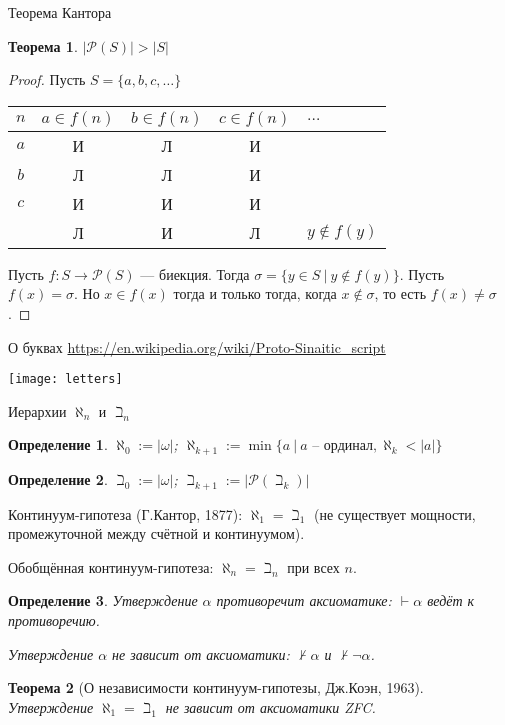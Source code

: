 \documentclass[aspectratio=169]{beamer}
\newtheorem{thm}{Теорема}[section]
\newtheorem{dfn}{Определение}[section]
\begin{document}
\begin{frame}{Теорема Кантора}
\begin{thm}$|\mathcal{P}(S)| > |S|$\end{thm}
\begin{proof}Пусть $S = \{a,b,c,\dots\}$

\begin{center}\begin{tabular}{c|cccl}
$n$ & $a \in f(n)$ & $b \in f(n)$ & $c \in f(n)$ & $\dots$ \\\hline
$a$ & \color{red}И & Л & И \\
$b$ &       Л & \color{red}Л& И \\
$c$ &   И & И & \color{red}И\\\hline
   & Л & И & Л & $y \notin f(y)$
\end{tabular}\end{center}\pause

Пусть $f: S \rightarrow \mathcal{P}(S)$ --- биекция. Тогда 
$\sigma = \{ y\in S\ |\ y\notin f(y)\}$. Пусть $f(x) = \sigma$.
Но $x \in f(x)$ тогда и только тогда, когда $x \notin \sigma$, то есть $f(x) \ne \sigma$.
\end{proof}
\end{frame}

\begin{frame}{О буквах}
\url{https://en.wikipedia.org/wiki/Proto-Sinaitic_script}
\begin{center}\texttt{[image: letters]}\end{center}
\end{frame}

\begin{frame}{Иерархии $\aleph_n$ и $\beth_n$}
\begin{dfn}$\aleph_0 := |\omega|$; $\aleph_{k+1} := \min\{ a\ |\ a\text{ -- ординал},\aleph_k < |a|\}$\end{dfn}
\begin{dfn}$\beth_0 := |\omega|$; $\beth_{k+1} := |\mathcal{P}(\beth_k)|$\end{dfn}

Континуум-гипотеза (Г.Кантор, 1877): $\aleph_1 = \beth_1$ (не существует мощности, промежуточной 
между счётной и континуумом).

Обобщённая континуум-гипотеза: $\aleph_n = \beth_n$ при всех $n$.

\begin{dfn}Утверждение $\alpha$ противоречит аксиоматике: $\vdash\alpha$ ведёт к противоречию.

Утверждение $\alpha$ не зависит от аксиоматики: $\not\vdash\alpha$ и $\not\vdash\neg\alpha$.\end{dfn}\pause

\begin{thm}[О независимости континуум-гипотезы, Дж.Коэн, 1963] Утверждение $\aleph_1 = \beth_1$
не зависит от аксиоматики ZFC.\end{thm}
\end{frame}
\end{document}
